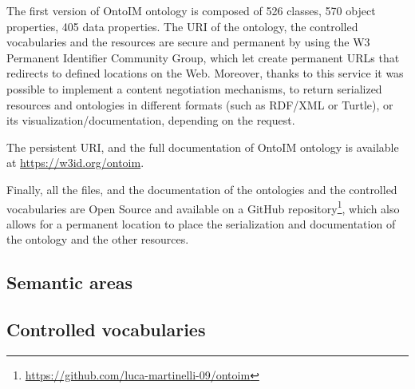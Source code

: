 The first version of \ac{OntoIM} ontology is composed of 526 classes, 570 object properties, 405 data properties. The \ac{URI} of the ontology, the controlled vocabularies and the resources are secure and permanent by using the  W3 Permanent Identifier Community Group, which let create permanent \acp{URL} that redirects to defined locations on the Web. Moreover, thanks to this service it was possible to implement a content negotiation mechanisms, to return serialized resources and ontologies in different formats (such as \ac{RDF}/\ac{XML} or Turtle), or its visualization/documentation, depending on the request.

The persistent \ac{URI}, and the full documentation of \ac{OntoIM} ontology is available at \url{https://w3id.org/ontoim}.

Finally, all the files, and the documentation of the ontologies and the controlled vocabularies are Open Source and available on a GitHub repository\footnote{\url{https://github.com/luca-martinelli-09/ontoim}}, which also allows for a permanent location to place the serialization and documentation of the ontology and the other resources.

\subsection{Semantic areas}
\label{subsec:semantic-areas}

\subsection{Controlled vocabularies}
\label{subsec:controlled-vocabularies}